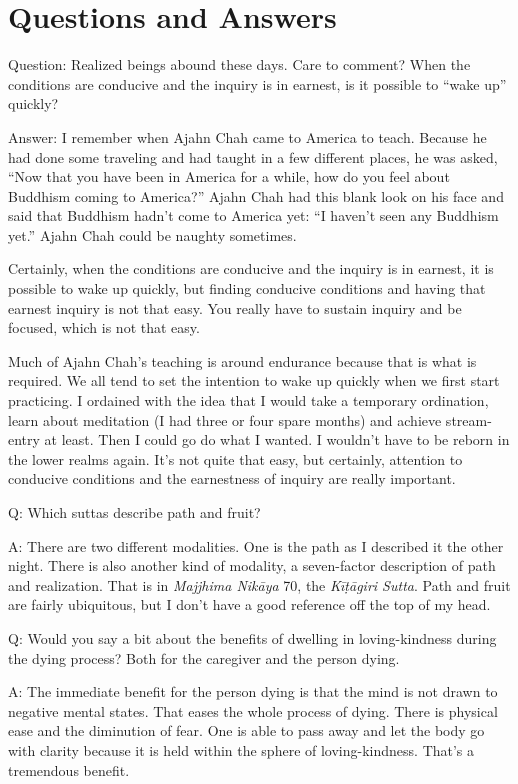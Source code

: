 \chapter{Questions and Answers}

\qaspace
Question: Realized beings abound these days. Care to comment? When the
conditions are conducive and the inquiry is in earnest, is it possible
to “wake up” quickly?

\qaspace
Answer: I remember when Ajahn Chah came to America to teach. Because he
had done some traveling and had taught in a few different places, he was
asked, “Now that you have been in America for a while, how do you feel
about Buddhism coming to America?” Ajahn Chah had this blank look on his
face and said that Buddhism hadn’t come to America yet: “I haven’t seen
any Buddhism yet.” Ajahn Chah could be naughty sometimes.

Certainly, when the conditions are conducive and the inquiry is in
earnest, it is possible to wake up quickly, but finding conducive
conditions and having that earnest inquiry is not that easy. You really
have to sustain inquiry and be focused, which is not that easy.

Much of Ajahn Chah’s teaching is around endurance because that is what
is required. We all tend to set the intention to wake up quickly when we
first start practicing. I ordained with the idea that I would take a
temporary ordination, learn about meditation (I had three or four spare
months) and achieve stream-entry at least. Then I could go do what I
wanted. I wouldn’t have to be reborn in the lower realms again. It’s not
quite that easy, but certainly, attention to conducive conditions and
the earnestness of inquiry are really important.

\qaspace
Q: Which suttas describe path and fruit?

\qaspace
A: There are two different modalities. One is the path as I described it
the other night. There is also another kind of modality, a seven-factor
description of path and realization. That is in \emph{Majjhima Nikāya}
70, the \emph{Kīṭāgiri Sutta}. Path and fruit are fairly ubiquitous, but
I don’t have a good reference off the top of my head.

\qaspace
Q: Would you say a bit about the benefits of dwelling in loving-kindness
during the dying process? Both for the caregiver and the person dying.

\qaspace
A: The immediate benefit for the person dying is that the mind is not
drawn to negative mental states. That eases the whole process of dying.
There is physical ease and the diminution of fear. One is able to pass
away and let the body go with clarity because it is held within the
sphere of loving-kindness. That’s a tremendous benefit.

